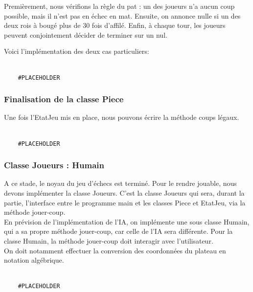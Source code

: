 \documentclass{article}
\begin{document}
Premièrement, nous vérifions la règle du pat : un des joueurs n'a aucun coup possible, mais il n'est pas en échec en mat.
Ensuite, on annonce nulle si un des deux rois à bougé plus de 30 fois d'affilé.
Enfin, à chaque tour, les joueurs peuvent conjointement décider de terminer sur un nul.
 
Voici l'implémentation des deux cas particuliers: 
\begin{verbatim}

    #PLACEHOLDER
\end{verbatim}


\subsubsection{Finalisation de la classe Piece}
Une fois l'EtatJeu mis en place, nous pouvons écrire la méthode coups légaux.

\begin{verbatim}

    #PLACEHOLDER
\end{verbatim}

\subsubsection{Classe Joueurs : Humain}
A ce stade, le noyau du jeu d'échecs est terminé. Pour le rendre jouable,
nous devons implémenter la classe Joueurs.
C'est la classe Joueurs qui sera, durant la partie, l'interface entre le programme main et les
classes Piece et EtatJeu, via la méthode jouer-coup.\\ En prévision de l'implémentation de l'IA,
on implémente une sous classe Humain, qui a sa propre méthode jouer-coup, car celle de l'IA sera différente.
Pour la classe Humain, la méthode jouer-coup doit interagir avec l'utilisateur. \\
On doit notamment effectuer la conversion des coordonnées du plateau en notation algébrique.


\begin{verbatim}

    #PLACEHOLDER
\end{verbatim}
\end{document}
